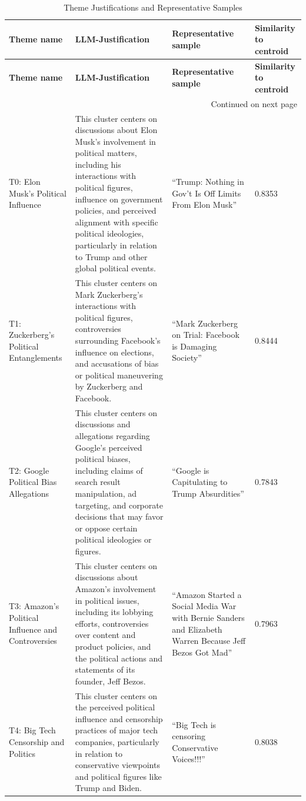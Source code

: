 \begin{longtable}{|p{3cm}|p{5cm}|p{4cm}|p{4cm}|}
\hline
\textbf{Theme name} & \textbf{LLM-Justification} & \textbf{Representative sample} & \textbf{Similarity to centroid} \\ \hline
\endfirsthead


\hline
\textbf{Theme name} & \textbf{LLM-Justification} & \textbf{Representative sample} & \textbf{Similarity to centroid} \\ \hline
\endhead

\hline \multicolumn{4}{|r|}{{Continued on next page}} \\ \hline
\endfoot

\hline
\caption{Theme Justifications and Representative Samples}
\label{tab:llm-themes}
\endlastfoot

T0: Elon Musk's Political Influence & This cluster centers on discussions about Elon Musk's involvement in political matters, including his interactions with political figures, influence on government policies, and perceived alignment with specific political ideologies, particularly in relation to Trump and other global political events. & “Trump: Nothing in Gov’t Is Off Limits From Elon Musk” & 0.8353\\ 
\hline
T1: Zuckerberg's Political Entanglements & This cluster centers on Mark Zuckerberg's interactions with political figures, controversies surrounding Facebook's influence on elections, and accusations of bias or political maneuvering by Zuckerberg and Facebook. & “Mark Zuckerberg on Trial: Facebook is Damaging Society” & 0.8444\\
\hline
T2: Google Political Bias Allegations & This cluster centers on discussions and allegations regarding Google's perceived political biases, including claims of search result manipulation, ad targeting, and corporate decisions that may favor or oppose certain political ideologies or figures. & “Google is Capitulating to Trump Absurdities” & 0.7843\\
\hline
T3: Amazon's Political Influence and Controversies & This cluster centers on discussions about Amazon's involvement in political issues, including its lobbying efforts, controversies over content and product policies, and the political actions and statements of its founder, Jeff Bezos. & “Amazon Started a Social Media War with Bernie Sanders and Elizabeth Warren Because Jeff Bezos Got Mad” & 0.7963 \\
\hline
T4: Big Tech Censorship and Politics & This cluster centers on the perceived political influence and censorship practices of major tech companies, particularly in relation to conservative viewpoints and political figures like Trump and Biden. & “Big Tech is censoring Conservative Voices!!!” & 0.8038 \\

\end{longtable}
